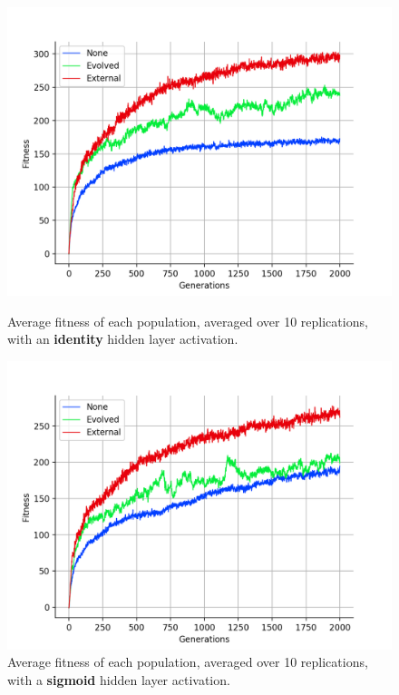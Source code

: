 \documentclass[12pt,a4paper,twoside,openright]{report}
\begin{document}
\begin{figure}[t]
   \centering
   \begin{minipage}{0.49\textwidth}
          \centering
          \captionsetup{width=.9\linewidth}
          \includegraphics[width=1.\linewidth]{results/average-identity.png}
          \caption{Average fitness of each population, averaged over 10 replications, with an {\bf identity} hidden layer activation.}
          \label{fig:average-identity}
   \end{minipage}
   \begin{minipage}{0.49\textwidth}
          \centering
          \captionsetup{width=.9\linewidth}
          \includegraphics[width=1.\linewidth]{results/average-sigmoid.png}
          \caption{Average fitness of each population, averaged over 10 replications, with a {\bf sigmoid} hidden layer activation.}
          \label{fig:average-sigmoid}
   \end{minipage}
\end{figure}
\end{document}
